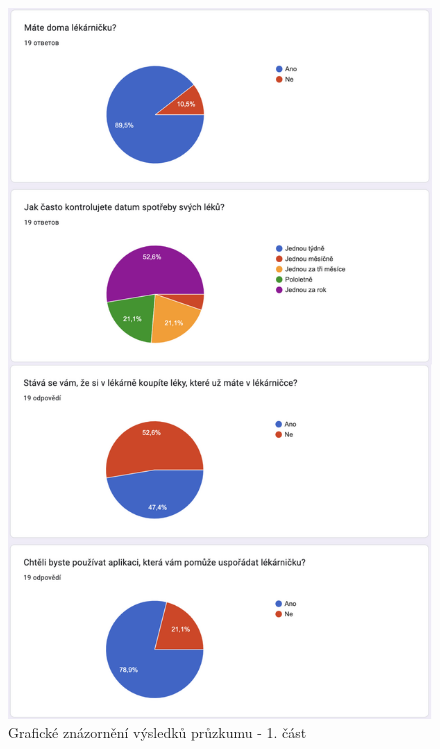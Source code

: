 \documentclass[a4paper, 11pt]{article}
\begin{document}
\newpage
\begin{figure}[!ht]
		\centering
		\includegraphics[width=\textwidth,height=\textheight,keepaspectratio]{Pruzkum.pdf}
		\caption{Grafické znázornění výsledků průzkumu - 1. část}
		\label{figure:pruzkum}
	\end{figure}
\end{document}
